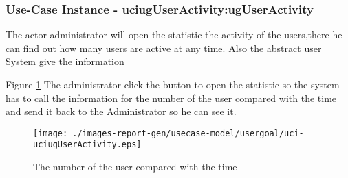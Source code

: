 
	\subsubsection{Use-Case Instance - uciugUserActivity:ugUserActivity}
	
	The actor administrator will open the statistic the activity of the users,there he can find out how many users are active at any time. Also the abstract user System give the information		  
	\begin{operationmodel}
	
	\end{operationmodel} 

	
	Figure \ref{fig:lu.uni.lassy.excalibur.examples.icrash-RE-UC-uci-uciugUserActivity}
	The administrator click the button to open the statistic so the system has to call the information for the number of the user compared with the time and send it back to the Administrator so he can see it. 
	
	\begin{figure}[htbp]
	\begin{center}
	
	\texttt{[image: ./images-report-gen/usecase-model/usergoal/uci-uciugUserActivity.eps]}
	\end{center}
	\caption[lu.uni.lassy.excalibur.examples.icrash Sequence Diagram: uci-uciugUserActivity]{The number of the user compared with the time}
	\label{fig:lu.uni.lassy.excalibur.examples.icrash-RE-UC-uci-uciugUserActivity}
	\end{figure}
	\vspace{0.5cm}
